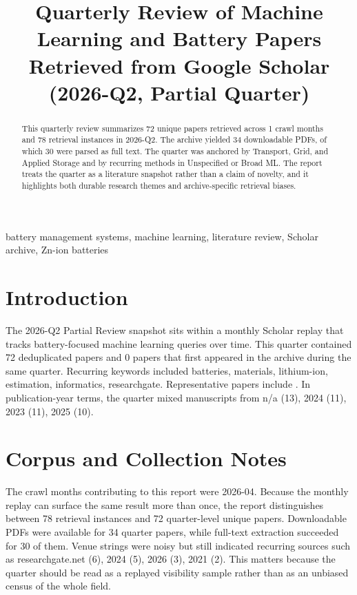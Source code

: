 \documentclass[conference]{IEEEtran}
\begin{document}
\title{ Quarterly Review of Machine Learning and Battery Papers Retrieved from Google Scholar (2026-Q2, Partial Quarter) }

\author{
}

\maketitle

\begin{abstract}
This quarterly review summarizes 72 unique papers retrieved across 1 crawl months and 78 retrieval instances in 2026-Q2. The archive yielded 34 downloadable PDFs, of which 30 were parsed as full text. The quarter was anchored by Transport, Grid, and Applied Storage and by recurring methods in Unspecified or Broad ML. The report treats the quarter as a literature snapshot rather than a claim of novelty, and it highlights both durable research themes and archive-specific retrieval biases.
\end{abstract}

\begin{IEEEkeywords}
battery management systems, machine learning, literature review, Scholar archive, Zn-ion batteries
\end{IEEEkeywords}

\section{Introduction}
The 2026-Q2 Partial Review snapshot sits within a monthly Scholar replay that tracks battery-focused machine learning queries over time. This quarter contained 72 deduplicated papers and 0 papers that first appeared in the archive during the same quarter. Recurring keywords included batteries, materials, lithium-ion, estimation, informatics, researchgate. Representative papers include \cite{stateestimationof2023,textminingfor2022,recentadvancesin2025,section02assessingna}. In publication-year terms, the quarter mixed manuscripts from n/a (13), 2024 (11), 2023 (11), 2025 (10).

\section{Corpus and Collection Notes}
The crawl months contributing to this report were 2026-04. Because the monthly replay can surface the same result more than once, the report distinguishes between 78 retrieval instances and 72 quarter-level unique papers. Downloadable PDFs were available for 34 quarter papers, while full-text extraction succeeded for 30 of them. Venue strings were noisy but still indicated recurring sources such as researchgate.net (6), 2024 (5), 2026 (3), 2021 (2). This matters because the quarter should be read as a replayed visibility sample rather than as an unbiased census of the whole field.
\end{document}
